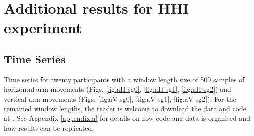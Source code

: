 \chapter{Additional results for HHI experiment} \label{appendix:f}

\graphicspath{{figs/appendixF/PDF/}}

\section{Time Series} \label{appendix:f:ts}

Time series for twenty participants with a window length size of 500 samples
of horizontal arm movements (Figs. \ref{fig:aH-sg0}, \ref{fig:aH-sg1}, \ref{fig:aH-sg2})
and vertical arm movements (Figs. \ref{fig:aV-sg0}, \ref{fig:aV-sg1}, \ref{fig:aV-sg2}).
For the remained window lengths, 
the reader is welcome to download the data and code at \cite{xochicale2018}.
See Appendix \ref{appendix:a}
for details on how code and data 
is organised and how results can be replicated. 



